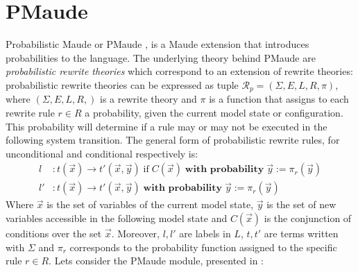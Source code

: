 \section{PMaude}
Probabilistic Maude or PMaude \cite{Agha2006}, is a Maude extension that introduces probabilities to the language. The underlying theory behind PMaude are  \textit{probabilistic rewrite theories} which correspond to an extension of rewrite theories: probabilistic rewrite theories can be expressed as tuple $\mathscr{R}_p = (\Sigma, E, L, R, \pi)$, where $(\Sigma, E, L, R,)$ is a rewrite theory and $\pi$ is a function that assigns to each rewrite rule $r \in R$ a probability, given the current model state or configuration. This probability will determine if a rule may or may not be executed in the following system transition. The general form of probabilistic rewrite rules, for unconditional and conditional respectively is:
\begin{align*}
    l &: t(\overrightarrow{x}) \rightarrow t'(\overrightarrow{x}, \overrightarrow{y}) \; \text{if} \; C(\overrightarrow{x}) \; \textbf{with probability} \; \overrightarrow{y} := \pi_r(\overrightarrow{y}) \\
    l' &: t(\overrightarrow{x}) \rightarrow t'(\overrightarrow{x}, \overrightarrow{y}) \; \textbf{with probability} \; \overrightarrow{y} := \pi_r(\overrightarrow{y})  
\end{align*}
Where $\overrightarrow{x}$ is the set of variables of the current model state,  $\overrightarrow{y}$ is the set of new variables accessible in the following model state and $C(\overrightarrow{x})$ is the conjunction of conditions over the set $\overrightarrow{x}$. Moreover, $l, l'$ are labels in $L$, $t,t'$ are terms written with $\Sigma$ and $\pi_r$ corresponds to the probability function assigned to the specific rule $r \in R$. 
Lets consider the PMaude module, presented in \cite{Agha2006}: 
